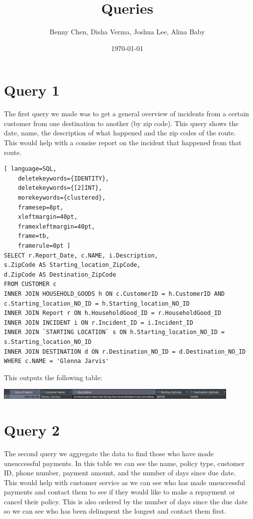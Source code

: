 \documentclass{article}
\title{Queries}
\author{Benny Chen, Disha Verma, Joshua Lee, Alina Baby}
\date{\today}
\begin{document}
\maketitle

\section*{Query 1}

The first query we made was to get a general overview of incidents from a certain customer from one destination to another (by zip code). This query shows the date, name, the description of what happened and the zip codes of the route. This would help with a consise report on the incident that happened from that route.
\begin{lstlisting}[ language=SQL,
    deletekeywords={IDENTITY},
    deletekeywords={[2]INT},
    morekeywords={clustered},
    framesep=8pt,
    xleftmargin=40pt,
    framexleftmargin=40pt,
    frame=tb,
    framerule=0pt ]
SELECT r.Report_Date, c.NAME, i.Description,
s.ZipCode AS Starting_location_ZipCode,
d.ZipCode AS Destination_ZipCode
FROM CUSTOMER c
INNER JOIN HOUSEHOLD_GOODS h ON c.CustomerID = h.CustomerID AND c.Starting_location_NO_ID = h.Starting_location_NO_ID
INNER JOIN Report r ON h.HouseholdGood_ID = r.HouseholdGood_ID
INNER JOIN INCIDENT i ON r.Incident_ID = i.Incident_ID
INNER JOIN `STARTING LOCATION` s ON h.Starting_location_NO_ID = s.Starting_location_NO_ID
INNER JOIN DESTINATION d ON r.Destination_NO_ID = d.Destination_NO_ID
WHERE c.NAME = 'Glenna Jarvis'
\end{lstlisting}

This outputs the following table:

\begin{center}
    \includegraphics[width=0.9\textwidth]{./images/Q1.png}
\end{center}

\section*{Query 2}

The second query we aggregate the data to find those who have made unsuccessful payments. In this table we can see the name, policy type, customer ID, phone number, payment amount, and the number of days since due date. This would help with customer service as we can see who has made unsuccessful payments and contact them to see if they would like to make a repayment or cancel their policy. This is also ordered by the number of days since the due date so we can see who has been delinquent the longest and contact them first.
\end{document}
